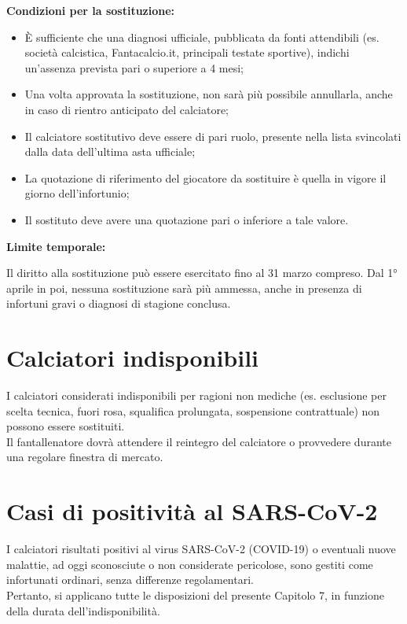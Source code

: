 \noindent \textbf{Condizioni per la sostituzione:}
\begin{itemize}
\item È sufficiente che una diagnosi ufficiale, pubblicata da fonti attendibili (es. società calcistica, Fantacalcio.it, principali testate sportive), indichi un'assenza prevista pari o superiore a 4 mesi;
\item Una volta approvata la sostituzione, non sarà più possibile annullarla, anche in caso di rientro anticipato del calciatore;
\item Il calciatore sostitutivo deve essere di pari ruolo, presente nella lista svincolati dalla data dell'ultima asta ufficiale;
\item La quotazione di riferimento del giocatore da sostituire è quella in vigore il giorno dell'infortunio;
\item Il sostituto deve avere una quotazione pari o inferiore a tale valore.
\end{itemize}

\noindent  \textbf{Limite temporale:}

Il diritto alla sostituzione può essere esercitato fino al 31 marzo compreso. Dal 1° aprile in poi, nessuna sostituzione sarà più ammessa, anche in presenza di infortuni gravi o diagnosi di stagione conclusa.

\section{Calciatori indisponibili}
\label{art:7.4}

I calciatori considerati indisponibili per ragioni non mediche (es. esclusione per scelta tecnica, fuori rosa, squalifica prolungata, sospensione contrattuale) non possono essere sostituiti.\\
Il fantallenatore dovrà attendere il reintegro del calciatore o provvedere durante una regolare finestra di mercato.

\section{Casi di positività al SARS-CoV-2}
\label{art:7.5}

I calciatori risultati positivi al virus SARS-CoV-2 (COVID-19) o eventuali nuove malattie, ad oggi sconosciute o non considerate pericolose, sono gestiti come infortunati ordinari, senza differenze regolamentari.\\
Pertanto, si applicano tutte le disposizioni del presente Capitolo 7, in funzione della durata dell'indisponibilità.



